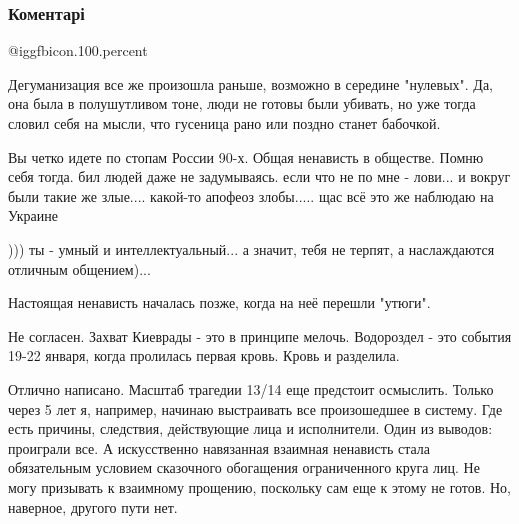  
 
 
 
 
\subsubsection{Коментарі}
\label{sec:26_10_2018.fb.lesev_igor.1.o_nenavisti.cmt}

\begin{itemize} %
 @igg{fbicon.100.percent} 


Дегуманизация все же произошла раньше, возможно в середине "нулевых". Да, она
была в полушутливом тоне, люди не готовы были убивать, но уже тогда словил себя
на мысли, что гусеница рано или поздно станет бабочкой.


Вы четко идете по стопам России 90-х. Общая ненависть в обществе. Помню себя
тогда. бил людей даже не задумываясь. если что не по мне - лови... и вокруг
были такие же злые.... какой-то апофеоз злобы..... щас всё это же наблюдаю на
Украине


))) ты - умный и интеллектуальный... а значит, тебя не терпят, а наслаждаются отличным общением)...

Настоящая ненависть началась позже, когда на неё перешли "утюги".


Не согласен. Захват Киеврады - это в принципе мелочь. Водороздел - это события
19-22 января, когда пролилась первая кровь. Кровь и разделила.


Отлично написано. Масштаб трагедии 13/14 еще предстоит осмыслить. Только через
5 лет я, например, начинаю выстраивать все произошедшее в систему. Где есть
причины, следствия, действующие лица и исполнители. Один из выводов: проиграли
все. А искусственно навязанная взаимная ненависть стала обязательным условием
сказочного обогащения ограниченного круга лиц. Не могу призывать к взаимному
прощению, поскольку сам еще к этому не готов. Но, наверное, другого пути нет.


\end{itemize}
